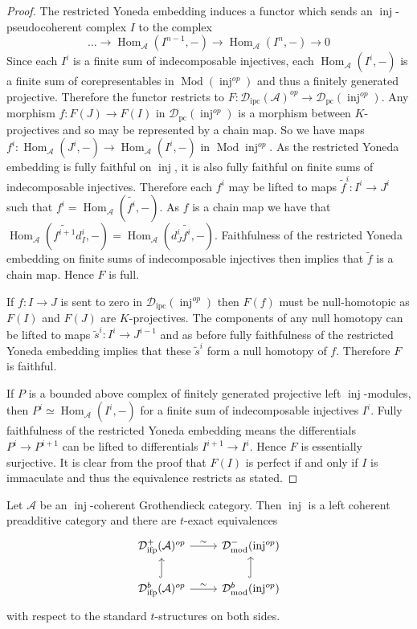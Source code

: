 \documentclass[12pt,oneside]{amsart}
\DeclareMathOperator{\Hom}{Hom}
\DeclareMathOperator{\Mod}{Mod}
\DeclareMathOperator{\fdmod}{mod}
\DeclareMathOperator{\inj}{inj}
\DeclareMathOperator{\ipscoh}{ipc}
\DeclareMathOperator{\ifp}{ifp}
\DeclareMathOperator{\pc}{pc}
\begin{document}
\begin{proof}
The restricted Yoneda embedding induces a functor which sends an $\inj$-pseudocoherent complex $I$ to the complex
\[
\dots \to \Hom_{\mathcal{A}}(I^{n-1},-) \to \Hom_{\mathcal{A}}(I^{n},-) \to 0
\]
Since each $I^i$ is a finite sum of indecomposable injectives, each $\Hom_{\mathcal{A}}(I^i,-)$ is a finite sum of corepresentables in $\Mod (\inj^{op})$ and thus a finitely generated projective. Therefore the functor restricts to $F: \mathcal{D}_{\ipscoh}(\mathcal{A})^{op} \to \mathcal{D}_{\pc}(\inj^{op})$. Any morphism $f: F(J) \to F(I)$ in $\mathcal{D}_{\pc}(\inj^{op})$ is a morphism between $K$-projectives and so may be represented by a chain map. So we have maps $f^i: \Hom_\mathcal{A}(J^i,-) \to \Hom_\mathcal{A}(I^i,-)$ in $\Mod \inj^{op}$. As the restricted Yoneda embedding is fully faithful on $\inj$, it is also fully faithful on finite sums of indecomposable injectives. Therefore each $f^i$ may be lifted to maps $\tilde{f}^i: I^i \to J^i$ such that $f^i = \Hom_{\mathcal{A}}(\tilde{f^i},-)$. As $f$ is a chain map we have that $\Hom_{\mathcal{A}}(\tilde{f^{i+1}}d_I^i,-) = \Hom_{\mathcal{A}}(d_J^i \tilde{f^{i}},-)$. Faithfulness of the restricted Yoneda embedding on finite sums of indecomposable injectives then implies that $\tilde{f}$ is a chain map. Hence $F$ is full. 

If $f: I \to J$ is sent to zero in $\mathcal{D}_{\ipscoh}(\inj^{op})$ then $F(f)$ must be null-homotopic as $F(I)$ and $F(J)$ are $K$-projectives. The components of any null homotopy can be lifted to maps $\tilde{s}^i: I^i \to J^{i-1}$ and as before fully faithfulness of the restricted Yoneda embedding implies that these $\tilde{s}^i$ form a null homotopy of $f$. Therefore $F$ is faithful. 

If $P$ is a bounded above complex of finitely generated projective left $\inj$-modules, then $P^i \simeq \Hom_{\mathcal{A}}(I^i,-)$ for a finite sum of indecomposable injectives $I^i$. Fully faithfulness of the restricted Yoneda embedding means the differentials $P^i \to P^{i+1}$ can be lifted to differentials $I^{i+1} \to I^{i}$. Hence $F$ is essentially surjective. It is clear from the proof that $F(I)$ is perfect if and only if $I$ is immaculate and thus the equivalence restricts as stated.
\end{proof}


\begin{theorem} \label{tiltingequiv2} Let $\mathcal{A}$ be an $\inj$-coherent Grothendieck category. Then $\inj$ is a left coherent preadditive category and there are $t$-exact equivalences
\[
\begin{tikzcd}
\mathcal{D}^{+}_{\ifp}(\mathcal{A})^{op} \arrow[r,"\sim"] & \mathcal{D}^{-}_{\fdmod}(\inj^{op}) \\
\mathcal{D}^b_{\ifp}(\mathcal{A})^{op} \arrow[u,hook] \arrow[r,"\sim"] &  \mathcal{D}^b_{\fdmod}(\inj^{op}) \arrow[u,hook]
\end{tikzcd}
\]
with respect to the standard $t$-structures on both sides. 
\end{theorem}
\end{document}
